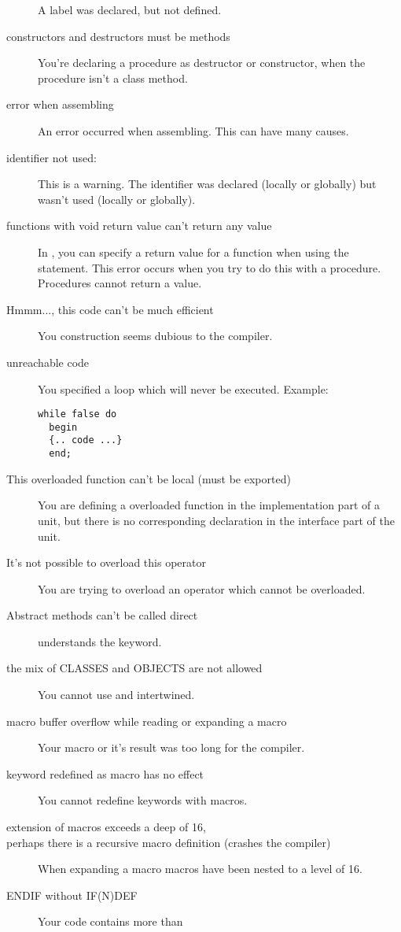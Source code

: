 \documentclass{report}
\begin{document}
\begin{description}
A label was declared, but not defined.
\item [constructors and destructors must be methods]
You're declaring a procedure as destructor or constructor, when the
procedure isn't a class method.
\item [error when assembling]
An error occurred when assembling. This can have many causes.
\item [identifier not used:]
This is a warning. The identifier was declared (locally or globally) but
wasn't used (locally or globally).
\item [functions with void return value can't return any value]
In \fpk, you can specify a return value for a function when using 
the  statement. This error occurs when you try to do this with a
procedure. Procedures  cannot return a value.
\item [Hmmm..., this code can't be much efficient]
You construction seems dubious to the compiler.
\item [unreachable code]
You specified a loop which will never be executed. Example:
\begin{verbatim}
while false do
  begin
  {.. code ...}
  end;
\end{verbatim}
\item [This overloaded function can't be local (must be exported)]
You are defining a overloaded function in the implementation part of a unit,
but there is no corresponding declaration in the interface part of the unit.
\item [It's not possible to overload this operator]
You are trying to overload an operator which cannot be overloaded.
\item [Abstract methods can't be called direct]
\fpk understands the  keyword.
\item [the mix of CLASSES and OBJECTS are not allowed]
You cannot use  and  intertwined.
\item [macro buffer overflow while reading or expanding a macro]
Your macro or it's result  was too long for the compiler.
\item [keyword redefined as macro has no effect]
You cannot redefine keywords with macros.
\item [extension of macros exceeds a deep of 16,\\ perhaps there is a recursive macro definition (crashes the compiler)]
When expanding a macro macros have been nested to a level of 16.
\item [ENDIF without IF(N)DEF]
Your code contains more  than 

\end{description}
\end{document}
